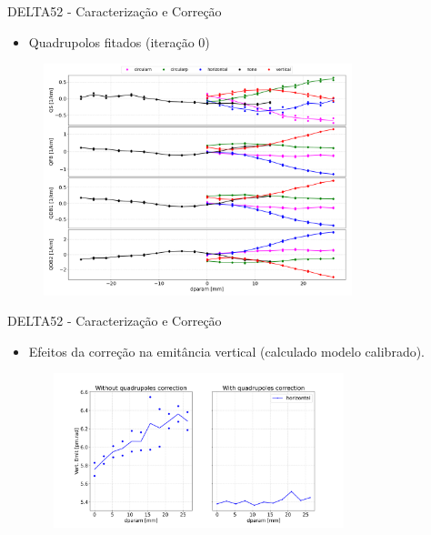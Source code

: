 \documentclass{beamer}					  %
\begin{document}
\begin{frame}{DELTA52 - Caracterização e Correção}
    \begin{itemize}
    		\item Quadrupolos fitados (iteração 0)
    \end{itemize}
    \begin{figure}[H]
        	\centering
            \includegraphics[width=0.8\textwidth]{2023-12-12/figures/knobs-before.png}
            \label{fig:bba}
    \end{figure} 
\end{frame}


\begin{frame}{DELTA52 - Caracterização e Correção}
    \begin{itemize}
    		\item Efeitos da correção na emitância vertical (calculado modelo calibrado).
    \end{itemize}
    \begin{figure}[H]
        	\centering
            \includegraphics[height=4.5cm, width=9cm]{2024-01-26/figures/quad_ffwd_emit_effect.png}\\ 
    \end{figure} 
\end{frame}
\end{document}

